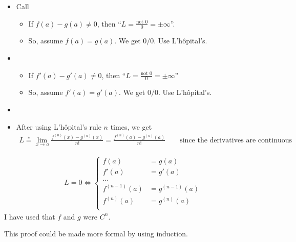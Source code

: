 \begin{itemize}
    \item Call  \begin{itemize}
              \item If \(f(a) - g(a) \neq 0\), then ``\(L = \frac{\text{not } 0}{0} = \pm \infty\)''.
              \item So, assume \(f(a) = g(a)\). We get \(0/0\). Use L'hôpital's.
          \end{itemize}
    \item {} \begin{itemize}
              \item If \(f'(a) - g'(a) \neq 0\), then ``\(L = \frac{\text{not } 0}{0} = \pm \infty\)''
              \item So, assume \(f'(a) = g'(a)\). We get \(0/0\). Use L'hôpital's.
          \end{itemize}
    \item {}
    \item After using L'hôpital's rule \(n\) times, we get \begin{align*}
              L \stackrel{*}{=} \lim_{x\to a} \frac{f^{(n)}(x) - g^{(n)}(x)}{n!} = \frac{f^{(n)}(a) - g^{(n)}(a)}{n!} \qquad \text{since the derivatives are continuous}
          \end{align*}
\end{itemize}
\begin{align*}
    L = 0 \Longleftrightarrow \begin{cases}
        f(a)         & = g(a)         \\
        f'(a)        & = g'(a)        \\
        \dots                         \\
        f^{(n-1)}(a) & = g^{(n-1)}(a) \\
        f^{(n)}(a)   & = g^{(n)}(a)   \\
    \end{cases}
\end{align*}
I have used that \(f\) and \(g\) were \(C^n\).

This proof could be made more formal by using induction.


